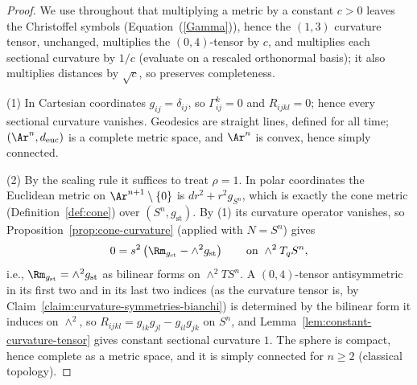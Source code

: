 \begin{proof}
We use throughout that multiplying a metric by a constant $c>0$
leaves the Christoffel symbols (Equation~(\ref{Gamma})), hence the
$(1,3)$ curvature tensor, unchanged, multiplies the $(0,4)$-tensor
by $c$, and multiplies each sectional curvature by $1/c$
(evaluate on a rescaled orthonormal basis); it also multiplies
distances by $\sqrt c$, so preserves completeness.

(1) In Cartesian coordinates $g_{ij}=\delta_{ij}$, so
$\Gamma^k_{ij}=0$ and $R_{ijkl}=0$; hence every sectional
curvature vanishes. Geodesics are straight lines, defined for all
time; $(\Ar^n,d_{\mathrm{euc}})$ is a complete metric space, and
$\Ar^n$ is convex, hence simply connected.

(2) By the scaling rule it suffices to treat $\rho=1$. In polar
coordinates the Euclidean metric on $\Ar^{n+1}\setminus\{0\}$ is
$dr^2+r^2g_{S^n}$, which is exactly the cone metric
(Definition~\ref{def:cone}) over $(S^n,g_{\mathrm{st}})$. By (1)
its curvature operator vanishes, so
Proposition~\ref{prop:cone-curvature} (applied with $N=S^n$) gives
$$0=s^2\left(\Rm_{g_{\mathrm{st}}}-\wedge^2g_{\mathrm{st}}\right)
\qquad\text{on }\wedge^2T_qS^n,$$
i.e., $\Rm_{g_{\mathrm{st}}}=\wedge^2g_{\mathrm{st}}$ as bilinear
forms on $\wedge^2TS^n$. A $(0,4)$-tensor antisymmetric in its
first two and in its last two indices (as the curvature tensor is,
by Claim~\ref{claim:curvature-symmetries-bianchi}) is determined by
the bilinear form it induces on $\wedge^2$, so
$R_{ijkl}=g_{ik}g_{jl}-g_{il}g_{jk}$ on $S^n$, and
Lemma~\ref{lem:constant-curvature-tensor} gives constant sectional
curvature $1$. The sphere is compact, hence complete as a metric
space, and it is simply connected for $n\ge2$ (classical
topology).


\end{proof}

